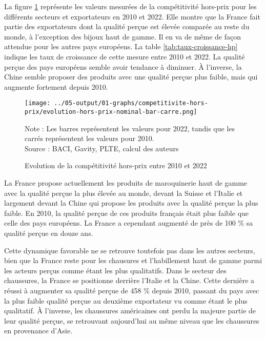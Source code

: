 \documentclass[french,10pt,a4paper]{article}
\begin{document}
La figure \ref{fig:hors-prix} représente les valeurs mesurées de la compétitivité hors-prix pour les différents secteurs et exportateurs en 2010 et 2022. Elle montre que la France fait partie des exportateurs dont la qualité perçue est élevée comparée au reste du monde, à l'exception des bijoux haut de gamme. Il en va de même de façon attendue pour les autres pays européens. La table \ref{tab:taux-croissance-hp} indique les taux de croissance de cette mesure entre 2010 et 2022. La qualité perçue des pays européens semble avoir tendance à diminuer. À l'inverse, la Chine semble proposer des produits avec une qualité perçue plus faible, mais qui augmente fortement depuis 2010.

\begin{figure}[!h]
  \centering
  \texttt{[image: ../05-output/01-graphs/competitivite-hors-prix/evolution-hors-prix-nominal-bar-carre.png]}
  \captionsetup{justification=justified, singlelinecheck=false, font=small}
  \caption*{Note : Les barres représentent les valeurs pour 2022, tandis que les carrés représentent les valeurs pour 2010. \\
  Source : BACI, Gavity, PLTE, calcul des auteurs}
  \captionsetup{justification=centering, singlelinecheck=true, font=normalsize}
  \caption{Evolution de la compétitivité hors-prix entre 2010 et 2022}
  \label{fig:hors-prix}
\end{figure}

\bigskip

La France propose actuellement les produits de maroquinerie haut de gamme avec la qualité perçue la plus élevée au monde, devant la Suisse et l'Italie et largement devant la Chine qui propose les produits avec la qualité perçue la plus faible. En 2010, la qualité perçue de ces produits français était plus faible que celle des pays européens. La France a cependant augmenté de près de 100 \% sa qualité perçue en douze ans.

Cette dynamique favorable ne se retrouve toutefois pas dans les autres secteurs, bien que la France reste pour les chausures et l'habillement haut de gamme parmi les acteurs perçus comme étant les plus qualitatifs. Dans le secteur des chaussures, la France se positionne derrière l'Italie et la Chine.  Cette dernière a réussi à augmenter sa qualité perçue de 458 \% depuis 2010, passant du pays avec la plus faible qualité perçue au deuxième exportateur vu comme étant le plus qualitatif. À l'inverse, les chaussures américaines ont perdu la majeure partie de leur qualité perçue, se retrouvant aujourd'hui au même niveau que les chaussures en provenance d'Asie.
\end{document}
